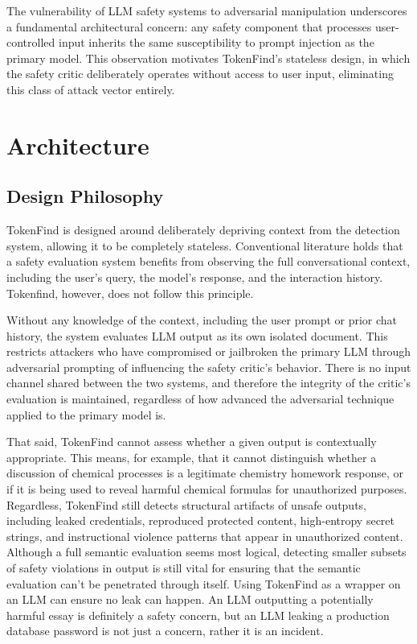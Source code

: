 \documentclass[11pt]{article}
\begin{document}
The vulnerability of LLM safety systems to adversarial manipulation underscores a fundamental architectural concern: any safety component that processes user-controlled input inherits the
same susceptibility to prompt injection as the primary model. This observation motivates TokenFind's stateless design, in which the safety critic deliberately operates without access to user input,
eliminating this class of attack vector entirely.

\section{Architecture}
\label{sec:architecture}

\subsection{Design Philosophy}
\label{sec:design-philosophy}

TokenFind is designed around deliberately depriving context from the detection system, allowing
it to be completely stateless. Conventional literature holds that a safety evaluation system benefits
from observing the full conversational context, including the user's query, the model's response,
and the interaction history. Tokenfind, however, does not follow this principle.

Without any knowledge of the context, including the user prompt or prior chat history, the
system evaluates LLM output as its own isolated document. This restricts attackers who have
compromised or jailbroken the primary LLM through adversarial prompting of influencing the
safety critic's behavior. There is no input channel shared between the two systems, and therefore
the integrity of the critic's evaluation is maintained, regardless of how advanced the adversarial
technique applied to the primary model is.

That said, TokenFind cannot assess whether a given output is contextually appropriate. This
means, for example, that it cannot distinguish whether a discussion of chemical processes is a
legitimate chemistry homework response, or if it is being used to reveal harmful chemical formulas for unauthorized purposes. Regardless, TokenFind still detects structural artifacts of unsafe
outputs, including leaked credentials, reproduced protected content, high-entropy secret strings,
and instructional violence patterns that appear in unauthorized content. Although a full semantic
evaluation seems most logical, detecting smaller subsets of safety violations in output is still vital
for ensuring that the semantic evaluation can't be penetrated through itself. Using TokenFind as
a wrapper on an LLM can ensure no leak can happen. An LLM outputting a potentially harmful
essay is definitely a safety concern, but an LLM leaking a production database password is not just
a concern, rather it is an incident.
\end{document}

